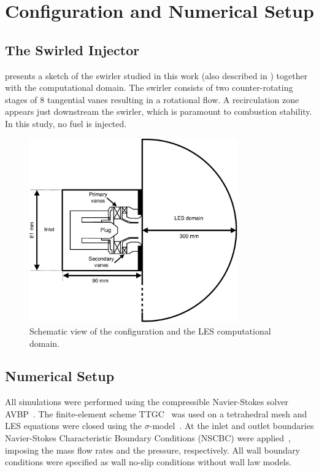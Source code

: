 \section{Configuration and Numerical Setup}\label{sec:swirler}

\subsection{The Swirled Injector}

 presents a sketch of the swirler studied in this work (also described in \cite{Daviller2017}) together with the computational domain. The swirler consists of two counter-rotating stages of 8 tangential vanes resulting in a rotational flow. A recirculation zone appears just downstream the swirler, which is paramount to combustion stability. In this study, no fuel is injected.

\begin{figure}[!ht]
\centering
\includegraphics[width=0.8\textwidth,keepaspectratio]{fig/applications/swirler/swirler_UQ.pdf}
\caption{Schematic view of the configuration and the LES computational domain.}
\label{fig:scheme-swirler}
\end{figure}

\subsection{Numerical Setup} \label{sec:num_setup}

All simulations were performed using the compressible Navier-Stokes solver AVBP~\cite{sch1999steady}. The finite-element scheme TTGC~\cite{colin_JCP_2000} was used on a tetrahedral mesh and LES equations were closed using the $\sigma$-model~\cite{nicoud_PoF_23_2011}. At the inlet and outlet boundaries Navier-Stokes Characteristic Boundary Conditions (NSCBC) were applied~\cite{poinsot1992boundary}, imposing the mass flow rates and the pressure, respectively. All wall boundary conditions were specified as wall no-slip conditions without wall law models.

